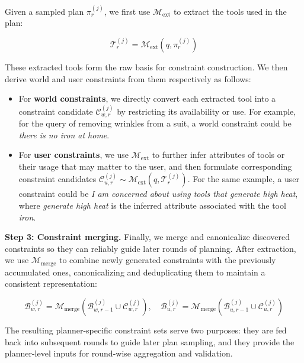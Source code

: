 \documentclass{llmxive}
\begin{document}
Given a sampled plan {\small $\pi^{(j)}_{r}$}, we first use $\mathcal{M}_{\mathrm{ext}}$ to extract the tools used in the plan:
\begin{footnotesize}
\begin{equation}
\mathcal{T}^{(j)}_{r} = \mathcal{M}_{\mathrm{ext}}(q, \pi^{(j)}_{r})
\end{equation}
\end{footnotesize}
These extracted tools form the raw basis for constraint construction. We then derive world and user constraints from them respectively as follows:
\begin{itemize}[topsep=-1.5pt, leftmargin=10pt, itemsep=0pt]
\item For \textbf{world constraints}, we directly convert each extracted tool into a constraint candidate {\small $\mathcal{C}^{(j)}_{w,r}$} by restricting its availability or use. For example, for the query of removing wrinkles from a suit, a world constraint could be \textit{there is no iron at home}.
\item For \textbf{user constraints}, we use $\mathcal{M}_{\mathrm{ext}}$ to further infer attributes of tools or their usage that may matter to the user, and then formulate corresponding constraint candidates {\small $\mathcal{C}^{(j)}_{u,r} \sim \mathcal{M}_{\mathrm{ext}}(q, \mathcal{T}^{(j)}_{r})$}.
For the same example, a user constraint could be \textit{I am concerned about using tools that generate high heat}, where \textit{generate high heat} is the inferred attribute associated with the tool \textit{iron}.
\end{itemize}

\noindent\textbf{Step 3: Constraint merging.}
Finally, we merge and canonicalize discovered constraints so they can reliably guide later rounds of planning.
After extraction, we use $\mathcal{M}_{\mathrm{merge}}$ to combine newly generated constraints with the previously accumulated ones, canonicalizing and deduplicating them to maintain a consistent representation:
\begin{footnotesize}
\begin{equation}
\mathcal{B}^{(j)}_{w,r} = \mathcal{M}_{\mathrm{merge}}(\mathcal{B}^{(j)}_{w,r-1} \cup \mathcal{C}^{(j)}_{w,r}), \quad
\mathcal{B}^{(j)}_{u,r} = \mathcal{M}_{\mathrm{merge}}(\mathcal{B}^{(j)}_{u,r-1} \cup \mathcal{C}^{(j)}_{u,r})
\end{equation}
\end{footnotesize}
The resulting planner-specific constraint sets serve two purposes: they are fed back into subsequent rounds to guide later plan sampling, and they provide the planner-level inputs for round-wise aggregation and validation.
\end{document}
